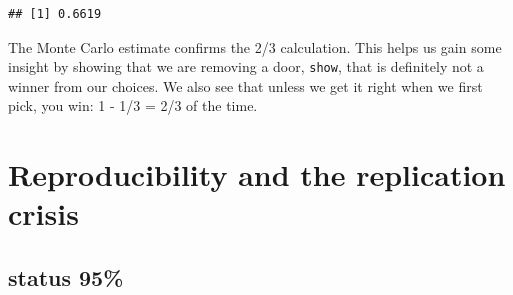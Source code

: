 \documentclass[
  openany]{book}
\newenvironment{Shaded}{\begin{snugshade}}{\end{snugshade}}
\newcommand{\ControlFlowTok}[1]{\textcolor[rgb]{0.13,0.29,0.53}{\textbf{#1}}}
\newcommand{\DecValTok}[1]{\textcolor[rgb]{0.00,0.00,0.81}{#1}}
\newcommand{\KeywordTok}[1]{\textcolor[rgb]{0.13,0.29,0.53}{\textbf{#1}}}
\newcommand{\NormalTok}[1]{#1}
\newcommand{\OperatorTok}[1]{\textcolor[rgb]{0.81,0.36,0.00}{\textbf{#1}}}
\newcommand{\StringTok}[1]{\textcolor[rgb]{0.31,0.60,0.02}{#1}}
\begin{document}
\begin{Shaded}
\end{Shaded}

\begin{verbatim}
## [1] 0.6619
\end{verbatim}

The Monte Carlo estimate confirms the 2/3 calculation. This helps us gain some insight by showing that we are removing a door, \texttt{show}, that is definitely not a winner from our choices. We also see that unless we get it right when we first pick, you win: 1 - 1/3 = 2/3 of the time.

\hypertarget{reproducibility-and-the-replication-crisis}{%
\chapter{Reproducibility and the replication crisis}\label{reproducibility-and-the-replication-crisis}}

\hypertarget{status-95-1}{%
\section*{status 95\%}\label{status-95-1}}
\end{document}
